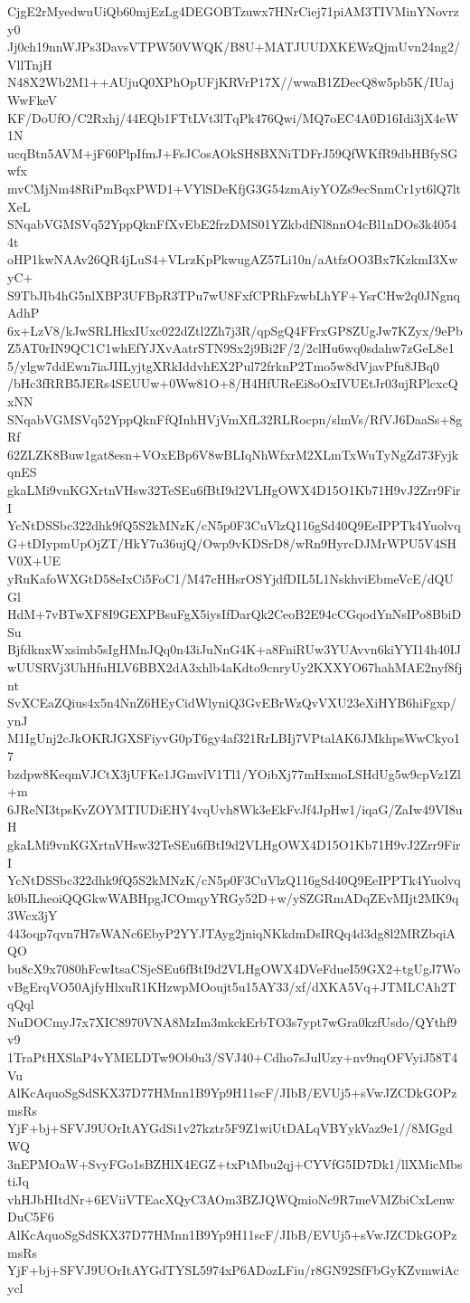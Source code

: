 CjgE2rMyedwuUiQb60mjEzLg4DEGOBTzuwx7HNrCiej71piAM3TIVMinYNovrzy0
Jj0ch19nnWJPs3DavsVTPW50VWQK/B8U+MATJUUDXKEWzQjmUvn24ng2/VllTnjH
N48X2Wb2M1++AUjuQ0XPhOpUFjKRVrP17X//wwaB1ZDecQ8w5pb5K/IUajWwFkeV
KF/DoUfO/C2Rxhj/44EQb1FTtLVt3lTqPk476Qwi/MQ7oEC4A0D16Idi3jX4eW1N
ucqBtn5AVM+jF60PlpIfmJ+FsJCosAOkSH8BXNiTDFrJ59QfWKfR9dbHBfySGwfx
mvCMjNm48RiPmBqxPWD1+VYlSDeKfjG3G54zmAiyYOZs9ecSnmCr1yt6lQ7ltXeL
SNqabVGMSVq52YppQknFfXvEbE2frzDMS01YZkbdfNl8nnO4cBl1nDOs3k40544t
oHP1kwNAAv26QR4jLuS4+VLrzKpPkwugAZ57Li10n/aAtfzOO3Bx7KzkmI3XwyC+
S9TbJIb4hG5nlXBP3UFBpR3TPu7wU8FxfCPRhFzwbLhYF+YsrCHw2q0JNgnqAdhP
6x+LzV8/kJwSRLHkxIUxc022dZtl2Zh7j3R/qpSgQ4FFrxGP8ZUgJw7KZyx/9ePb
Z5AT0rIN9QC1C1whEfYJXvAatrSTN9Sx2j9Bi2F/2/2clHu6wq0sdahw7zGeL8e1
5/ylgw7ddEwn7iaJIILyjtgXRkIddvhEX2Pul72frknP2Tmo5w8dVjavPfu8JBq0
/bHc3fRRB5JERs4SEUUw+0Ww81O+8/H4HfUReEi8oOxIVUEtJr03ujRPlcxcQxNN
SNqabVGMSVq52YppQknFfQInhHVjVmXfL32RLRocpn/slmVs/RfVJ6DaaSs+8gRf
62ZLZK8Buw1gat8esn+VOxEBp6V8wBLIqNhWfxrM2XLmTxWuTyNgZd73FyjkqnES
gkaLMi9vnKGXrtnVHsw32TeSEu6fBtI9d2VLHgOWX4D15O1Kb71H9vJ2Zrr9FirI
YcNtDSSbc322dhk9fQ5S2kMNzK/cN5p0F3CuVlzQ116gSd40Q9EeIPPTk4Yuolvq
G+tDIypmUpOjZT/HkY7u36ujQ/Owp9vKDSrD8/wRn9HyrcDJMrWPU5V4SHV0X+UE
yRuKafoWXGtD58eIxCi5FoC1/M47cHHsrOSYjdfDIL5L1NskhviEbmeVcE/dQUGl
HdM+7vBTwXF8I9GEXPBsuFgX5iysIfDarQk2CeoB2E94cCGqodYnNsIPo8BbiDSu
BjfdknxWxsimb5sIgHMnJQq0n43iJuNnG4K+a8FniRUw3YUAvvn6kiYYI14h40IJ
wUUSRVj3UhHfuHLV6BBX2dA3xhlb4aKdto9cnryUy2KXXYO67hahMAE2nyf8fjnt
SvXCEaZQius4x5n4NnZ6HEyCidWlyniQ3GvEBrWzQvVXU23eXiHYB6hiFgxp/ynJ
M1IgUnj2cJkOKRJGXSFiyvG0pT6gy4af321RrLBIj7VPtalAK6JMkhpsWwCkyo17
bzdpw8KeqmVJCtX3jUFKe1JGmvlV1Tl1/YOibXj77mHxmoLSHdUg5w9cpVz1Zl+m
6JReNI3tpsKvZOYMTIUDiEHY4vqUvh8Wk3eEkFvJf4JpHw1/iqaG/ZaIw49VI8uH
gkaLMi9vnKGXrtnVHsw32TeSEu6fBtI9d2VLHgOWX4D15O1Kb71H9vJ2Zrr9FirI
YcNtDSSbc322dhk9fQ5S2kMNzK/cN5p0F3CuVlzQ116gSd40Q9EeIPPTk4Yuolvq
k0bILheoiQQGkwWABHpgJCOmqyYRGy52D+w/ySZGRmADqZEvMIjt2MK9q3Wcx3jY
443oqp7qvn7H7sWANc6EbyP2YYJTAyg2jniqNKkdmDsIRQq4d3dg8l2MRZbqiAQO
bu8cX9x7080hFcwItsaCSjeSEu6fBtI9d2VLHgOWX4DVeFdueI59GX2+tgUgJ7Wo
vBgErqVO50AjfyHlxuR1KHzwpMOoujt5u15AY33/xf/dXKA5Vq+JTMLCAh2TqQql
NuDOCmyJ7x7XIC8970VNA8MzIm3mkckErbTO3s7ypt7wGra0kzfUsdo/QYthf9v9
1TraPtHXSlaP4vYMELDTw9Ob0u3/SVJ40+Cdho7sJulUzy+nv9nqOFVyiJ58T4Vu
AlKcAquoSgSdSKX37D77HMnn1B9Yp9H11scF/JIbB/EVUj5+sVwJZCDkGOPzmsRs
YjF+bj+SFVJ9UOrItAYGdSi1v27kztr5F9Z1wiUtDALqVBYykVaz9e1//8MGgdWQ
3nEPMOaW+SvyFGo1sBZHlX4EGZ+txPtMbu2qj+CYVfG5ID7Dk1/llXMicMbstiJq
vhHJbHItdNr+6EViiVTEacXQyC3AOm3BZJQWQmioNc9R7meVMZbiCxLenwDuC5F6
AlKcAquoSgSdSKX37D77HMnn1B9Yp9H11scF/JIbB/EVUj5+sVwJZCDkGOPzmsRs
YjF+bj+SFVJ9UOrItAYGdTYSL5974xP6ADozLFiu/r8GN92SfFbGyKZvmwiAcycl
